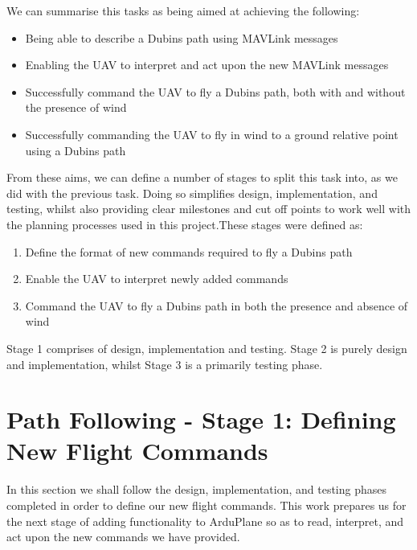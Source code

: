 We can summarise this tasks as being aimed at achieving the following:

\begin{itemize}
	\item Being able to describe a Dubins path using MAVLink messages %
	\item Enabling the UAV to interpret and act upon the new MAVLink messages
	\item Successfully command the UAV to fly a Dubins path, both with and without the presence of wind
	\item Successfully commanding the UAV to fly in wind to a ground relative point using a Dubins path 
\end{itemize}

From these aims, we can define a number of stages to split this task into, as we did with the previous task. Doing so simplifies design, implementation, and testing, whilst also providing clear milestones and cut off points to work well with the planning processes used in this project.These stages were defined as:

\begin{enumerate}
	\item Define the format of new commands required to fly a Dubins path
	\item Enable the UAV to interpret newly added commands
	\item Command the UAV to fly a Dubins path in both the presence and absence of wind
\end{enumerate}

Stage 1 comprises of design, implementation and testing. Stage 2 is purely design and implementation, whilst Stage 3 is a primarily testing phase.  

\section{Path Following - Stage 1: Defining New Flight Commands}
\label{task2:stage1}

In this section we shall follow the design, implementation, and testing phases completed in order to define our new flight commands. This work prepares us for the next stage of adding functionality to ArduPlane so as to read, interpret, and act upon the new commands we have provided. 


